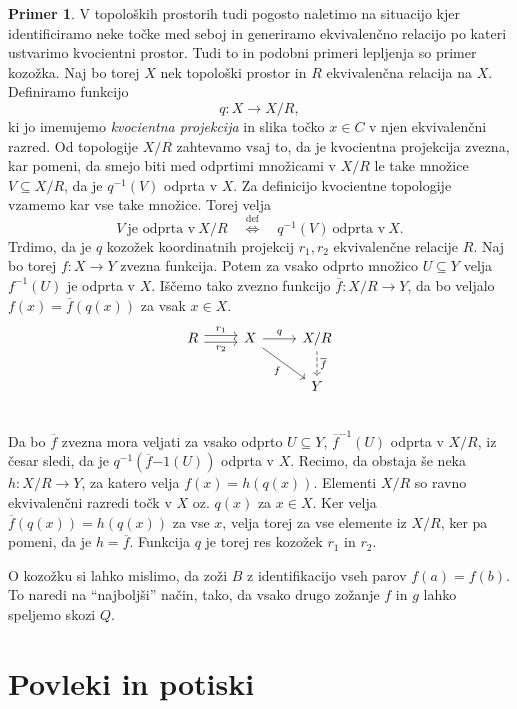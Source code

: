 \documentclass[12pt,a4paper]{book}
\theoremstyle{definition}
\theoremstyle{plain}
\theoremstyle{definition}
\newtheorem{primer}{Primer}[section]
\theoremstyle{remark}
\begin{document}
\begin{primer}
V topoloških prostorih tudi pogosto naletimo na situacijo kjer identificiramo neke točke med seboj in generiramo ekvivalenčno relacijo po kateri ustvarimo kvocientni prostor. Tudi to in podobni primeri lepljenja so primer kozožka. Naj bo torej $X$ nek topološki prostor in $R$ ekvivalenčna relacija na $X$. Definiramo funkcijo
$$ q : X \to X/R,$$
ki jo imenujemo \emph{kvocientna projekcija} in slika točko $x \in C$ v njen ekvivalenčni razred. Od topologije $X/R$ zahtevamo vsaj to, da je kvocientna projekcija zvezna, kar pomeni, da smejo biti med odprtimi množicami v $X/R$ le take množice $V \subseteq X/R$, da je $q^{-1}(V)$ odprta v $X$. Za definicijo kvocientne topologije vzamemo kar vse take množice. Torej velja
$$V \ \text{je odprta v} \ X/R \quad \overset{\text{def}}{\Leftrightarrow} \quad q^{-1}(V) \ \text{odprta v} \ X.$$
Trdimo, da je $q$ kozožek koordinatnih projekcij $r_1,r_2$ ekvivalenčne relacije $R$.
Naj bo torej $f : X \to Y$ zvezna funkcija. Potem za vsako odprto množico $U \subseteq Y$ velja $f^{-1}(U)$ je odprta v $X$. Iščemo tako zvezno funkcijo $\overline{f} : X/R \to Y$, da bo veljalo $f(x) = \overline{f}(q(x))$ za vsak $x \in X$.
$$\begin{tikzcd}
R \ar[r, shift left, "r_1"] \ar[r, shift right, "r_2"'] & X \ar[r, "q"] \ar[dr, "f"'] & X/R \ar[d, dashed, "\overline{f}"] \\
& & Y \\
\end{tikzcd}$$
Da bo $\overline{f}$ zvezna mora veljati za vsako odprto $U \subseteq Y$, $\overline{f}^{-1}(U)$ odprta v $X/R$, iz česar sledi, da je $q^{-1}(\overline{f}{-1}(U))$ odprta v $X$. Recimo, da obstaja še neka $h : X/R \to Y$, za katero velja $f(x) = h(q(x))$. Elementi $X/R$ so ravno ekvivalenčni razredi točk v $X$ oz. $q(x)$ za $x \in X$. Ker velja $\overline{f}(q(x)) = h(q(x))$ za vse $x$, velja torej za vse elemente iz $X/R$, ker pa pomeni, da je $h = \overline{f}$. Funkcija $q$ je torej res kozožek $r_1$ in $r_2$.

\end{primer}

O kozožku si lahko mislimo, da zoži $B$ z identifikacijo vseh parov $f(a) = f(b)$. To naredi na "`najboljši"' način, tako, da vsako drugo zožanje $f$ in $g$ lahko speljemo skozi $Q$.


\section{Povleki in potiski}
\end{document}
